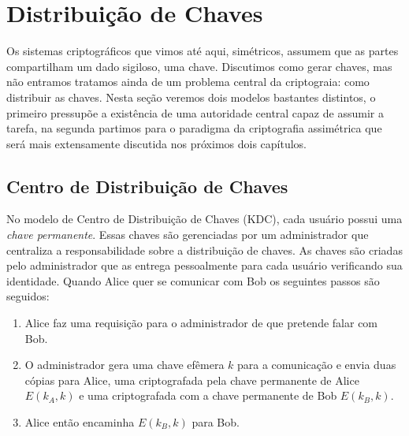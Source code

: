 \chapter{Distribuição de Chaves}
\label{cha:distribuicao-chaves}

Os sistemas criptográficos que vimos até aqui, simétricos, assumem que as partes compartilham um dado sigiloso, uma chave.
Discutimos como gerar chaves, mas não entramos tratamos ainda de um problema central da criptograia: como distribuir as chaves.
Nesta seção veremos dois modelos bastantes distintos, o primeiro pressupõe a existência de uma autoridade central capaz de assumir a tarefa, na segunda partimos para o paradigma da criptografia assimétrica que será mais extensamente discutida nos próximos dois capítulos.

\section{Centro de Distribuição de Chaves}
\label{sec:kdc}

No modelo de Centro de Distribuição de Chaves (KDC), cada usuário possui uma {\em chave permanente}.
Essas chaves são gerenciadas por um administrador que centraliza a responsabilidade sobre a distribuição de chaves.
As chaves são criadas pelo administrador que as entrega pessoalmente para cada usuário verificando sua identidade.
Quando Alice quer se comunicar com Bob os seguintes passos são seguidos:

\begin{enumerate}
\item Alice faz uma requisição para o administrador de que pretende falar com Bob.
\item O administrador gera uma chave efêmera $k$ para a comunicação e envia duas cópias para Alice, uma criptografada pela chave permanente de Alice $E(k_A, k)$ e uma criptografada com a chave permanente de Bob $E(k_B, k)$.
\item Alice então encaminha $E(k_B, k)$ para Bob.
\end{enumerate}

\begin{center}
\end{center}

